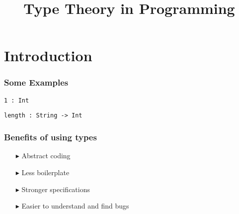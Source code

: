 \documentclass[14pt,compress]{beamer}
\title{Type Theory in Programming}
\date{}
\begin{document}

\begin{frame}\label{frame : titlepage}
\titlepage
\end{frame}

\section{Introduction}
\begin{frame}\label{frame : some examples}
\frametitle{Some Examples}

\begin{block}{}
\textcolor{beamer@blendedblue}{
\texttt{1 : Int}}
\end{block}

\begin{block}{}
\textcolor{beamer@blendedblue}{
\texttt{length : String -> Int}}
\end{block}


\begin{block}{}
\end{block}

\end{frame}
\begin{frame}

\frametitle{Benefits of using types}

\begin{enumerate}
\item[$\blacktriangleright$] Abstract coding
\item[$\blacktriangleright$] Less boilerplate
\item[$\blacktriangleright$] Stronger specifications
\item[$\blacktriangleright$] Easier to understand and find bugs 
\end{enumerate}

\end{frame}
\end{document}
